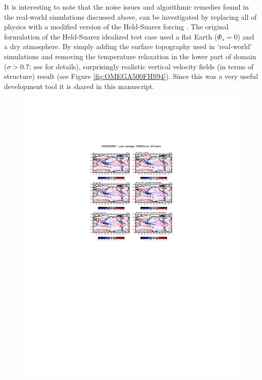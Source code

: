\documentclass[draft]{agujournal2019}
\begin{document}
It is interesting to note that the noise issues and algorithmic remedies found in the real-world simulations discussed above, can be investigated by replacing all of physics with a modified version of the Held-Suarez forcing \cite{HS1994}. The original formulation of the Held-Suarez idealized test case used a flat Earth ($\Phi_s=0$) and a dry atmosphere. By simply adding the surface topography used in `real-world' simulations and removing the temperature relaxation in the lower part of domain ($\sigma>0.7$; see  for details), surprisingly realistic vertical velocity fields (in terms of structure) result (see Figure \ref{fig:OMEGA500FHS94}). Since this was a very useful development tool it is shared in this manuscript. 

\begin{figure}[t]
\begin{center}
\includegraphics[width=145mm]{figs/OMEGA500F2000climo.pdf}
\end{center}

\end{figure}
\end{document}
